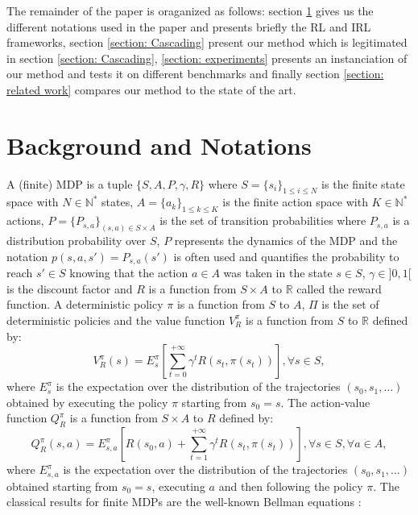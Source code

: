 \documentclass{llncs}
\newcommand{\0}{\mathbf{0}}
\newcommand{\1}{\mathbf{1}}
\begin{document}
The remainder of the paper is oraganized as follows: section \ref{section: background} gives us the different notations used in the paper and presents briefly the RL and IRL frameworks, section \ref{section: Cascading} present our method which is legitimated in section \ref{section: Cascading}, \ref{section: experiments} presents an instanciation of our method and tests it on different benchmarks and finally section \ref{section: related work} compares our method to the state of the art.

\section{Background and Notations}
\label{section: background}
A (finite) MDP \cite{puterman1994markov} is a tuple $\{S,A,P,\gamma,R\}$ where $S=\{s_i\}_{1\leq i \leq N}$ is the finite state space with $N\in\mathbb{N}^*$ states, $A=\{a_k\}_{1\leq k \leq K}$ is the finite action space with $K\in\mathbb{N}^*$ actions, $P=\{P_{s,a}\}_{(s,a)\in S\times A}$ is the set of transition probabilities where $P_{s,a}$ is a distribution probability over $S$, $P$ represents the dynamics of the MDP and the notation $p(s,a,s')=P_{s,a}(s')$ is often used and quantifies the probability to reach $s'\in S$ knowing that the action $a \in A$ was taken in the state $s\in S$, $\gamma\in]0,1[$ is the discount factor and $R$ is a function from $S\times A$ to $\mathbb{R}$ called the reward function. A deterministic policy $\pi$ is a function from $S$ to $A$, $\Pi$ is the set of deterministic policies and the value function $V^\pi_R$ is a function from $S$ to $\mathbb{R}$ defined by:
\begin{equation}
V^\pi_R(s)=E^\pi_s[\sum_{t=0}^{+\infty}\gamma^tR(s_t,\pi(s_t))], \forall s \in S,
\end{equation}
where $E^\pi_s$ is the expectation over the distribution of the trajectories $(s_0,s_1,\dots)$ obtained by executing the policy $\pi$ starting from $s_0=s$.
The action-value function $Q^\pi_R$ is a function from $S\times A$ to $R$ defined by:
\begin{equation}
Q^\pi_R(s,a)=E^\pi_{s,a}[R(s_0,a)+\sum_{t=1}^{+\infty}\gamma^tR(s_t,\pi(s_t))], \forall s \in S,\forall a \in A,
\end{equation}
where $E^\pi_{s,a}$ is the expectation over the distribution of the trajectories $(s_0,s_1,\dots)$ obtained starting from $s_0=s$, executing $a$ and then following the policy $\pi$.
The classical results for finite MDPs are the well-known Bellman equations \cite{sutton1998reinforcement}:
\end{document}
